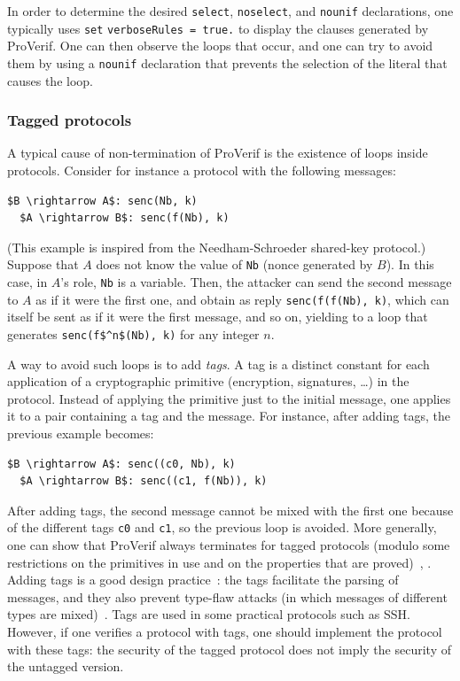 \documentclass{book}
\begin{document}
In order to determine the desired \lstinline!select!, \lstinline!noselect!, and \lstinline!nounif! declarations,
one typically uses \lstinline!set! \lstinline!verboseRules = true.! to
display the clauses generated by ProVerif. One can then observe the
loops that occur, and one can try to avoid them by using a
\lstinline!nounif! declaration that prevents the selection of the
literal that causes the loop.

\subsubsection{Tagged protocols}

A typical cause of non-termination of ProVerif is the existence of
loops inside protocols. Consider for instance a protocol with the following
messages:
\begin{lstlisting}[numbers=none]
  $B \rightarrow A$: senc(Nb, k)
  $A \rightarrow B$: senc(f(Nb), k)
\end{lstlisting}
(This example is inspired from the Needham-Schroeder shared-key
protocol.)  Suppose that $A$ does not know the value of \lstinline!Nb!
(nonce generated by $B$). In this case, in $A$'s role, \lstinline!Nb!
is a variable. Then, the attacker can send the second message to $A$ as if
it were the first one, and obtain as reply \lstinline!senc(f(f(Nb), k)!,
which can itself be sent as if it were the first message, and so
on, yielding to a loop that generates \lstinline!senc(f$^n$(Nb), k)!
for any integer $n$.

A way to avoid such loops is to add \emph{tags}. A tag is a distinct
constant for each application of a cryptographic primitive
(encryption, signatures, \ldots) in the protocol. Instead of applying
the primitive just to the initial message, one applies it to a pair
containing a tag and the message. For instance, after adding tags, the
previous example becomes:
\begin{lstlisting}[numbers=none]
  $B \rightarrow A$: senc((c0, Nb), k)
  $A \rightarrow B$: senc((c1, f(Nb)), k)
\end{lstlisting}
After adding tags, the second message cannot be mixed with the first one
because of the different tags \lstinline!c0! and \lstinline!c1!, so the previous loop is avoided. More generally, one can show that ProVerif always terminates for tagged protocols (modulo some restrictions on the primitives in use and on the properties that are proved)~\cite{Blanchet04e},
\cite[Section~8.1]{Blanchet08c}.
Adding tags is a good design practice~\cite{Abadi96}: the tags facilitate the parsing of messages, and they also prevent type-flaw attacks (in which messages of different types are mixed)~\cite{Heather00b}. Tags are used in some practical protocols such as SSH. However, if one verifies a protocol with tags, one should implement the protocol with these tags: the security of the tagged protocol does not imply the security of the untagged version.
\end{document}

